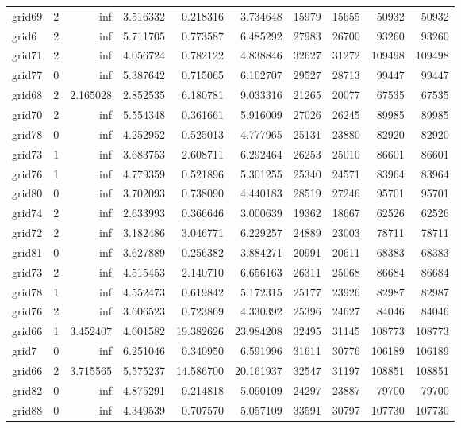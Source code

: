 \begin{longtable}{|l|r|r|r|r|r|r|r|r|r|}
grid69 & 2 & inf & 3.516332 & 0.218316 & 3.734648 & 15979 & 15655 & 50932 & 50932 \\
grid6 & 2 & inf & 5.711705 & 0.773587 & 6.485292 & 27983 & 26700 & 93260 & 93260 \\
grid71 & 2 & inf & 4.056724 & 0.782122 & 4.838846 & 32627 & 31272 & 109498 & 109498 \\
grid77 & 0 & inf & 5.387642 & 0.715065 & 6.102707 & 29527 & 28713 & 99447 & 99447 \\
grid68 & 2 & 2.165028 & 2.852535 & 6.180781 & 9.033316 & 21265 & 20077 & 67535 & 67535 \\
grid70 & 2 & inf & 5.554348 & 0.361661 & 5.916009 & 27026 & 26245 & 89985 & 89985 \\
grid78 & 0 & inf & 4.252952 & 0.525013 & 4.777965 & 25131 & 23880 & 82920 & 82920 \\
grid73 & 1 & inf & 3.683753 & 2.608711 & 6.292464 & 26253 & 25010 & 86601 & 86601 \\
grid76 & 1 & inf & 4.779359 & 0.521896 & 5.301255 & 25340 & 24571 & 83964 & 83964 \\
grid80 & 0 & inf & 3.702093 & 0.738090 & 4.440183 & 28519 & 27246 & 95701 & 95701 \\
grid74 & 2 & inf & 2.633993 & 0.366646 & 3.000639 & 19362 & 18667 & 62526 & 62526 \\
grid72 & 2 & inf & 3.182486 & 3.046771 & 6.229257 & 24889 & 23003 & 78711 & 78711 \\
grid81 & 0 & inf & 3.627889 & 0.256382 & 3.884271 & 20991 & 20611 & 68383 & 68383 \\
grid73 & 2 & inf & 4.515453 & 2.140710 & 6.656163 & 26311 & 25068 & 86684 & 86684 \\
grid78 & 1 & inf & 4.552473 & 0.619842 & 5.172315 & 25177 & 23926 & 82987 & 82987 \\
grid76 & 2 & inf & 3.606523 & 0.723869 & 4.330392 & 25396 & 24627 & 84046 & 84046 \\
grid66 & 1 & 3.452407 & 4.601582 & 19.382626 & 23.984208 & 32495 & 31145 & 108773 & 108773 \\
grid7 & 0 & inf & 6.251046 & 0.340950 & 6.591996 & 31611 & 30776 & 106189 & 106189 \\
grid66 & 2 & 3.715565 & 5.575237 & 14.586700 & 20.161937 & 32547 & 31197 & 108851 & 108851 \\
grid82 & 0 & inf & 4.875291 & 0.214818 & 5.090109 & 24297 & 23887 & 79700 & 79700 \\
grid88 & 0 & inf & 4.349539 & 0.707570 & 5.057109 & 33591 & 30797 & 107730 & 107730 \\

\end{longtable}
